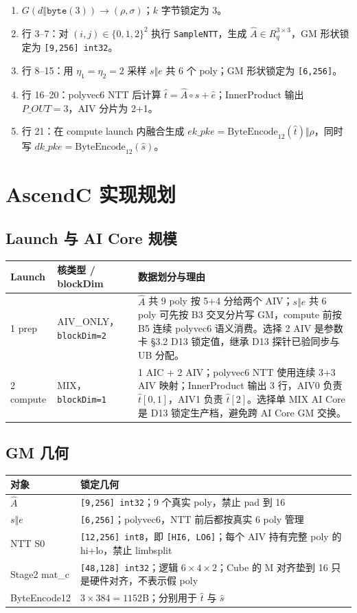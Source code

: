 \documentclass[UTF8,a4paper,11pt]{ctexart}
\begin{document}
\begin{enumerate}
  \item $G(d\Vert \texttt{byte}(3))\to(\rho,\sigma)$；$k$ 字节锁定为 3。
  \item 行 3--7：对 $(i,j)\in\{0,1,2\}^2$ 执行 \texttt{SampleNTT}，生成 $\hat A\in R_q^{3\times3}$，GM 形状锁定为 \texttt{[9,256] int32}。
  \item 行 8--15：用 $\eta_1=\eta_2=2$ 采样 $s\Vert e$ 共 6 个 poly；GM 形状锁定为 \texttt{[6,256]}。
  \item 行 16--20：polyvec6 NTT 后计算 $\hat t=\hat A\circ\hat s+\hat e$；InnerProduct 输出 $P\_OUT=3$，AIV 分片为 2+1。
  \item 行 21：在 compute launch 内融合生成 $ek\_pke=\text{ByteEncode}_{12}(\hat t)\Vert\rho$，同时写 $dk\_pke=\text{ByteEncode}_{12}(\hat s)$。
\end{enumerate}

\section{AscendC 实现规划}

\subsection{Launch 与 AI Core 规模}

\begin{longtable}{@{}L{2.5cm}L{3.0cm}L{7.6cm}@{}}
\toprule
Launch & 核类型 / blockDim & 数据划分与理由 \\
 prep & AIV\_ONLY，\texttt{blockDim=2} & $\hat A$ 共 9 poly 按 5+4 分给两个 AIV；$s\Vert e$ 共 6 poly 可先按 B3 交叉分片写 GM，compute 前按 B5 连续 polyvec6 语义消费。选择 2 AIV 是参数卡 §3.2 D13 锁定值，继承 D13 探针已验同步与 UB 分配。 \\
2 compute & MIX，\texttt{blockDim=1} & 1 AIC + 2 AIV；polyvec6 NTT 使用连续 3+3 AIV 映射；InnerProduct 输出 3 行，AIV0 负责 $\hat t[0,1]$，AIV1 负责 $\hat t[2]$。选择单 MIX AI Core 是 D13 锁定生产档，避免跨 AI Core GM 交换。 \\
\bottomrule
\end{longtable}

\subsection{GM 几何}

\begin{longtable}{@{}L{3.7cm}L{9.5cm}@{}}
\toprule
对象 & 锁定几何 \\
\midrule
$\hat A$ & \texttt{[9,256] int32}；9 个真实 poly，禁止 pad 到 16 \\
$s\Vert e$ & \texttt{[6,256]}；polyvec6，NTT 前后都按真实 6 poly 管理 \\
NTT S0 & \texttt{[12,256] int8}，即 \texttt{[HI6, LO6]}；每个 AIV 持有完整 poly 的 hi+lo，禁止 limbsplit \\
Stage2 mat\_c & \texttt{[48,128] int32}；逻辑 $6\times4\times2$；Cube 的 M 对齐垫到 16 只是硬件对齐，不表示假 poly \\
ByteEncode12 & $3\times384=1152$B；分别用于 $\hat t$ 与 $\hat s$ \\
\bottomrule
\end{longtable}
\end{document}
